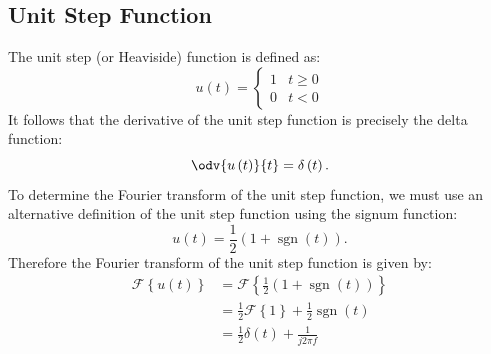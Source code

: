 \documentclass{article}
\DeclareMathOperator{\sgn}{sgn}
\begin{document}
\subsection{Unit Step Function}
The unit step (or Heaviside) function is defined as:
\begin{equation*}
    u\left( t \right) = \begin{cases}
        1 & t \geq 0 \\
        0 & t < 0
    \end{cases}
\end{equation*}
It follows that the derivative of the unit step function is precisely the delta function:
\begin{equation*}
    \odv{u\left( t \right)}{t} = \delta\left( t \right).
\end{equation*}
To determine the Fourier transform of the unit step function, we must use an alternative definition
of the unit step function using the signum function:
\begin{equation*}
    u\left( t \right) = \frac{1}{2} \left( 1 + \sgn\left( t \right) \right).
\end{equation*}
Therefore the Fourier transform of the unit step function is given by:
\begin{align*}
    \mathscr{F}\left\{ u\left( t \right) \right\} & = \mathscr{F}\left\{ \frac{1}{2} \left( 1 + \sgn\left( t \right) \right) \right\} \\
                                                  & = \frac{1}{2} \mathscr{F}\left\{ 1 \right\} + \frac{1}{2} \sgn\left( t \right)    \\
                                                  & = \frac{1}{2} \delta\left( t \right) + \frac{1}{j 2 \pi f}
\end{align*}
\end{document}

